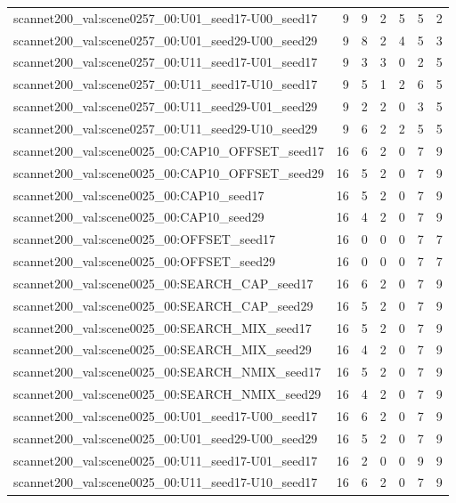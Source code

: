 \begin{table}[t]
\begin{tabular}{lrrrrrr}
scannet200\_val:scene0257\_00:U01\_seed17-U00\_seed17 & 9 & 9 & 2 & 5 & 5 & 2 \\
scannet200\_val:scene0257\_00:U01\_seed29-U00\_seed29 & 9 & 8 & 2 & 4 & 5 & 3 \\
scannet200\_val:scene0257\_00:U11\_seed17-U01\_seed17 & 9 & 3 & 3 & 0 & 2 & 5 \\
scannet200\_val:scene0257\_00:U11\_seed17-U10\_seed17 & 9 & 5 & 1 & 2 & 6 & 5 \\
scannet200\_val:scene0257\_00:U11\_seed29-U01\_seed29 & 9 & 2 & 2 & 0 & 3 & 5 \\
scannet200\_val:scene0257\_00:U11\_seed29-U10\_seed29 & 9 & 6 & 2 & 2 & 5 & 5 \\
scannet200\_val:scene0025\_00:CAP10\_OFFSET\_seed17 & 16 & 6 & 2 & 0 & 7 & 9 \\
scannet200\_val:scene0025\_00:CAP10\_OFFSET\_seed29 & 16 & 5 & 2 & 0 & 7 & 9 \\
scannet200\_val:scene0025\_00:CAP10\_seed17 & 16 & 5 & 2 & 0 & 7 & 9 \\
scannet200\_val:scene0025\_00:CAP10\_seed29 & 16 & 4 & 2 & 0 & 7 & 9 \\
scannet200\_val:scene0025\_00:OFFSET\_seed17 & 16 & 0 & 0 & 0 & 7 & 7 \\
scannet200\_val:scene0025\_00:OFFSET\_seed29 & 16 & 0 & 0 & 0 & 7 & 7 \\
scannet200\_val:scene0025\_00:SEARCH\_CAP\_seed17 & 16 & 6 & 2 & 0 & 7 & 9 \\
scannet200\_val:scene0025\_00:SEARCH\_CAP\_seed29 & 16 & 5 & 2 & 0 & 7 & 9 \\
scannet200\_val:scene0025\_00:SEARCH\_MIX\_seed17 & 16 & 5 & 2 & 0 & 7 & 9 \\
scannet200\_val:scene0025\_00:SEARCH\_MIX\_seed29 & 16 & 4 & 2 & 0 & 7 & 9 \\
scannet200\_val:scene0025\_00:SEARCH\_NMIX\_seed17 & 16 & 5 & 2 & 0 & 7 & 9 \\
scannet200\_val:scene0025\_00:SEARCH\_NMIX\_seed29 & 16 & 4 & 2 & 0 & 7 & 9 \\
scannet200\_val:scene0025\_00:U01\_seed17-U00\_seed17 & 16 & 6 & 2 & 0 & 7 & 9 \\
scannet200\_val:scene0025\_00:U01\_seed29-U00\_seed29 & 16 & 5 & 2 & 0 & 7 & 9 \\
scannet200\_val:scene0025\_00:U11\_seed17-U01\_seed17 & 16 & 2 & 0 & 0 & 9 & 9 \\
scannet200\_val:scene0025\_00:U11\_seed17-U10\_seed17 & 16 & 6 & 2 & 0 & 7 & 9 \\

\end{tabular}
\end{table}

